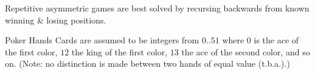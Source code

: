 \categorycontents{}


Repetitive asymmetric games are best solved by recursing backwards from
known winning \& losing positions.


\begin{algorithm}{Poker Hands}
\desc
Cards are assumed to be integers from $0..51$ where $0$ is the ace of
the first color, $12$ the king of the first color, $13$ the ace of the
second color, and so on.  (Note: no distinction is made between two
hands of equal value (t.b.a.).)

\end{algorithm}


\begin{sourceslandscape}
\end{sourceslandscape}
